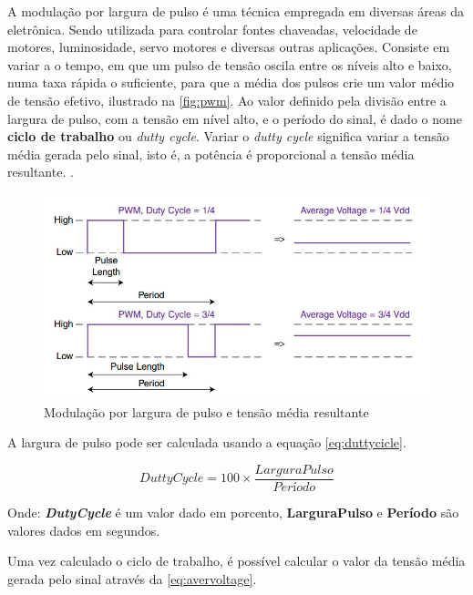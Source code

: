A modulação por largura de pulso é uma técnica empregada em diversas áreas da eletrônica. Sendo utilizada para controlar fontes chaveadas, velocidade de motores, luminosidade, servo motores e diversas outras aplicações. Consiste em variar a o tempo, em que um pulso de tensão oscila entre os níveis alto e baixo, numa taxa rápida o suficiente, para que a média dos pulsos crie um valor médio de tensão efetivo, ilustrado na \autoref{fig:pwm}. Ao valor definido pela divisão entre a largura de pulso, com a tensão em nível alto, e o período do sinal, é dado o nome \textbf{ciclo de trabalho} ou \textit{dutty cycle}. Variar o \textit{dutty cycle} significa variar a tensão média gerada pelo sinal, isto é, a potência é proporcional a tensão média resultante. .

\begin{figure}[h]
	\centering
	\includegraphics[width=1\textwidth]{figuras/pwm.jpg}
	\caption{Modulação por largura de pulso e tensão média resultante}
	\label{fig:pwm}
\end{figure}

A largura de pulso pode ser calculada usando a equação \autoref{eq:duttycicle}.

\begin{equation}
{DuttyCycle} = 100 \times \frac{LarguraPulso}{Período}  
\label{eq:duttycicle}
\end{equation}

Onde: \textbf{\textit{DutyCycle}} é um valor dado em porcento, \textbf{LarguraPulso} e \textbf{Período} são valores dados em segundos.\par

Uma vez calculado o ciclo de trabalho, é possível calcular o valor da tensão média gerada pelo sinal através da \autoref{eq:avervoltage}.


